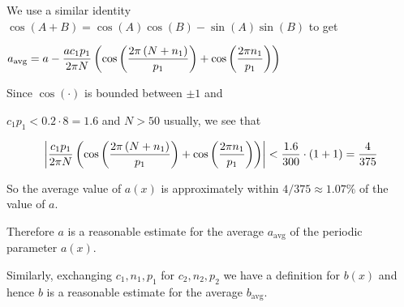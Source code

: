 \begin{prop}
\begin{pf}
We use a similar identity $\cos(A+B) = \cos(A)\cos(B) - \sin(A)\sin(B)$ to get

$\begin{aligned}
a_{\text{avg}} 
&= a 
-\frac{ac_1 p_1}{2\pi N} \left(\cos\left(\frac{2\pi \left(N+n_1\right)}{p_1}\right)
+\cos\left(\frac{2\pi n_1}{p_1}\right)\right)
\end{aligned}$

Since $\cos(\cdot)$ is bounded between $\pm 1$ and

$c_1 p_1<0.2\cdot 8 = 1.6$ and $N>50$ usually, we see that

$$\left|\frac{c_1 p_1}{2\pi N} \left(\cos\left(\frac{2\pi \left(N+n_1\right)}{p_1}\right)
+\cos\left(\frac{2\pi n_1}{p_1}\right)\right)\right| < \frac{1.6}{300} \cdot \left(1+1\right)=\frac{4}{375}$$


So the average value of $a(x)$ is approximately within $4/375 \approx 1.07\%$ of the value of $a$.

Therefore $a$ is a reasonable estimate for the average $a_{\text{avg}}$ of the periodic parameter $a(x)$.

Similarly, exchanging $c_1,n_1,p_1$ for $c_2,n_2,p_2$ we have a definition for $b(x)$ and hence $b$ is a reasonable estimate for the average $b_{\text{avg}}$.

\end{pf}
\end{prop}

